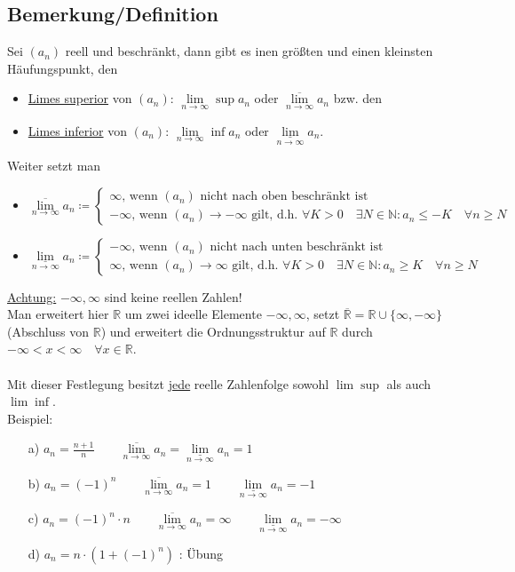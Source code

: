 \documentclass[12pt, titlepage]{article}
\newcommand{\R}{\mathds{R}}
\newcommand{\N}{\mathds{N}}
\newcommand{\infn}{n\rightarrow\infty}
\newcommand{\limsuperior}[1]{\lim\limits_{#1}\sup}
\newcommand{\liminferior}[1]{\lim\limits_{#1}\inf}
\renewcommand{\>}{\rightarrow}
\renewcommand{\*}{\cdot}
\renewcommand{\limsup}[1]{\underset{#1}{\overline{\lim}}}
\renewcommand{\liminf}[1]{\underset{#1}{\underline{\lim}}}
\begin{document}
	\subsection{Bemerkung/Definition}
	Sei $(a_n)$ reell und beschränkt, dann gibt es inen größten und einen kleinsten Häufungspunkt, den
	\begin{itemize}
		\item \underline{Limes superior} von $(a_n)$: $\limsuperior{\infn}a_n$ oder $\limsup{\infn}a_n$ bzw. den
		\item \underline{Limes inferior} von $(a_n)$: $\liminferior{\infn}a_n$ oder $\liminf{\infn}a_n$.
	\end{itemize}
	Weiter setzt man
	\begin{itemize}
		\item $\limsup{\infn}a_n\coloneqq\begin{cases}
			\infty\textrm{, wenn }(a_n)\textrm{ nicht nach oben beschränkt ist}\\
			-\infty\textrm{, wenn }(a_n)\>-\infty\textrm{ gilt, d.h. }\forall K>0\quad\exists N\in\N\colon a_n\leq-K\quad\forall n\geq N 
		\end{cases}$
		\item $\liminf{\infn}a_n\coloneqq\begin{cases}
		-\infty\textrm{, wenn }(a_n)\textrm{ nicht nach unten beschränkt ist}\\
		\infty\textrm{, wenn }(a_n)\>\infty\textrm{ gilt, d.h. }\forall K>0\quad\exists N\in\N\colon a_n\geq K\quad\forall n\geq N
		\end{cases}$
	\end{itemize}
	\underline{Achtung:} $-\infty,\infty$ sind keine reellen Zahlen!\\
	Man erweitert hier $\R$ um zwei ideelle Elemente $-\infty,\infty$, setzt $\overline{\R}=\R\cup\{\infty,-\infty\}$ (Abschluss von $\R$) und erweitert die Ordnungsstruktur auf $\R$ durch\\ $-\infty<x<\infty\quad\forall x\in\R$.\\
	\\
	Mit dieser Festlegung besitzt \underline{jede} reelle Zahlenfolge sowohl $\limsuperior{}$ als auch $\liminferior{}$.\\
	Beispiel:
	\begin{itemize}
		\item[a)] $a_n=\frac{n+1}{n}\qquad\limsup{\infn}a_n=\liminf{\infn}a_n=1$
		\item[b)] $a_n=(-1)^n\qquad\limsup{\infn}a_n=1\qquad\liminf{\infn}a_n=-1$
		\item[c)] $a_n=(-1)^n\*n\qquad\limsup{\infn}a_n=\infty\qquad\liminf{\infn}a_n=-\infty$
		\item[d)] $a_n=n\*(1+(-1)^n)$ : Übung
	\end{itemize}
\end{document}
